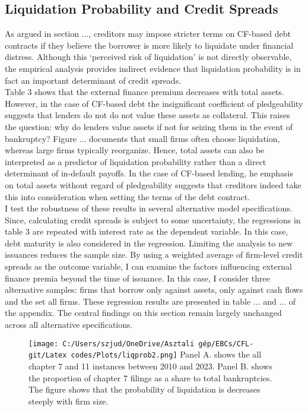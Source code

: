 \documentclass[12pt]{article}
\begin{document}
\subsection{Liquidation Probability and Credit Spreads \label{sec:emp liqprob}} 
As argued in section ..., creditors may impose stricter terms on CF-based debt contracts if they believe the borrower is more likely to liquidate under financial distress. Although this `perceived risk of liquidation' is not directly observable, the empirical analysis provides indirect evidence that liquidation probability is in fact an important determinant of credit spreads.  \vspace{3mm} \\ 
Table 3 shows that the external finance premium decreases with total assets. However, in the case of CF-based debt the insignificant coefficient of pledgeability suggests that lenders do not do not value these assets as collateral. This raises the question: why do lenders value assets if not for seizing them in the event of bankruptcy? Figure ... documents that small firms often choose liquidation, whereas large firms typically reorganize. Hence, total assets can also be interpreted as a predictor of liquidation probability rather than a direct determinant of in-default payoffs. In the case of CF-based lending, he emphasis on total assets without regard of pledgeability suggests that creditors indeed take this into consideration when setting the terms of the debt contract. \vspace{3mm} \\ 
I test the robustness of these results in several alternative model specifications. Since, calculating credit spreads is subject to some uncertainty, the regressions in table 3 are repeated with interest rate as the dependent variable. In this case, debt maturity is also considered in the regression. Limiting the analysis to new issuances reduces the sample size. By using a weighted average of firm-level credit spreads as the outcome variable, I can examine the factors influencing external finance premia beyond the time of issuance. In this case, I consider three alternative samples: firms that borrow only against assets, only against cash flows and the set all firms. These regression results are presented in table ... and ... of the appendix. The central findings on this section remain largely unchanged across all alternative specifications. 
 
 \begin{figure}[H]  %
    \centering  \label{chart:mixplot}
    \texttt{[image: C:/Users/szjud/OneDrive/Asztali gép/EBCs/CFL-git/Latex codes/Plots/liqprob2.png]}
     \footnotesize \justifying Panel A. shows the all chapter 7 and 11 instances between 2010 and 2023. Panel B. shows the proportion of chapter 7 filings as a share to total bankruptcies. The figure shows that the probability of liquidation is decreases steeply with firm size. 
\end{figure}
\end{document}

